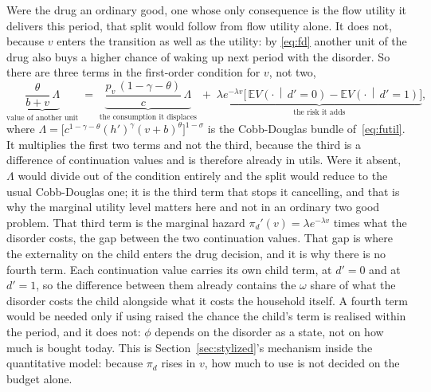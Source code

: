 \documentclass[10pt]{article}
\begin{document}
Were the drug an ordinary good, one whose only consequence is the flow
utility it delivers this period, that split would follow from flow utility
alone.
It does not, because $v$ enters the transition as well as the utility: by
\eqref{eq:fd} another unit of the drug also buys a higher chance of waking up
next period with the disorder. So there are three terms in the first-order condition for $v$, not
two,
\begin{equation}\label{eq:fcv}
\underbrace{\frac{\theta}{b+v}\,\Lambda}_{\text{value of another unit}}
\;=\;
\underbrace{\frac{p_v\,(1-\gamma-\theta)}{c}\,\Lambda}_{\text{the consumption it displaces}}
\;+\;
\underbrace{\lambda e^{-\lambda v}\Big[\,\mathbb E V\!\left(\cdot\,\middle|\,d'=0\right)-
\mathbb E V\!\left(\cdot\,\middle|\,d'=1\right)\Big]}_{\text{the risk it adds}} ,
\end{equation}
where $\Lambda=\big[c^{1-\gamma-\theta}(h')^{\gamma}(v+b)^{\theta}\big]^{1-\sigma}$
is the Cobb-Douglas bundle of~\eqref{eq:futil}. It multiplies the first two
terms and not the third, because the third is a difference of continuation
values and is therefore already in utils. Were it absent, $\Lambda$ would divide
out of the condition entirely and the split would reduce to the usual
Cobb-Douglas one; it is the third term that stops it cancelling, and that is why
the marginal utility level matters here and not in an ordinary two good
problem. That third term is the marginal hazard $\pi_d'(v)=\lambda e^{-\lambda
v}$ times what the disorder costs, the gap between the two continuation values.
That gap is where the externality on the child enters the drug decision,
and it is why there is no fourth term. Each continuation value carries its own child
term, at $d'=0$ and at $d'=1$, so the difference between them already contains the
$\omega$ share of what the disorder costs the child alongside what it costs the
household itself. A fourth term would be needed only if using raised the chance the
child's term is realised within the period, and it does not: $\phi$ depends on the
disorder as a state, not on how much is bought today.
This is Section~\ref{sec:stylized}'s mechanism inside the quantitative model:
because $\pi_d$ rises in $v$, how much to use is not decided on the budget alone.
\end{document}
